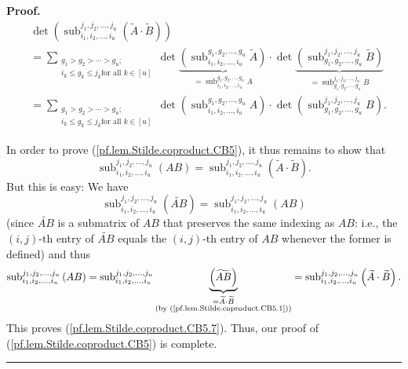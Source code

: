 \documentclass[numbers=enddot,12pt,final,onecolumn,notitlepage]{scrartcl}%
\numberwithin{exer}{section}
\theoremstyle{definition}
\newenvironment{proof}[1][Proof]{\noindent\textbf{#1.} }{\ \rule{0.5em}{0.5em}}
\let\sumnonlimits\sum
\renewcommand{\sum}{\sumnonlimits\limits}
\theoremstyle{plainsl}
\begin{document}
\begin{proof}
\begin{align*}
&  \det\left(  \operatorname*{sub}\nolimits_{i_{1},i_{2},\ldots,i_{u}}%
^{j_{1},j_{2},\ldots,j_{u}}\left(  \widetilde{A}\cdot\widetilde{B}\right)
\right) \\
&  =\sum_{\substack{g_{1}>g_{2}>\cdots>g_{u};\\i_{k}\leq g_{k}\leq j_{k}\text{
for all }k\in\left[  u\right]  }}\det\underbrace{\left(  \operatorname*{sub}%
\nolimits_{i_{1},i_{2},\ldots,i_{u}}^{g_{1},g_{2},\ldots,g_{u}}\widetilde{A}%
\right)  }_{=\operatorname*{sub}\nolimits_{i_{1},i_{2},\ldots,i_{u}}%
^{g_{1},g_{2},\ldots,g_{u}}A}\cdot\det\underbrace{\left(  \operatorname*{sub}%
\nolimits_{g_{1},g_{2},\ldots,g_{u}}^{j_{1},j_{2},\ldots,j_{u}}\widetilde{B}%
\right)  }_{=\operatorname*{sub}\nolimits_{g_{1},g_{2},\ldots,g_{u}}%
^{j_{1},j_{2},\ldots,j_{u}}B}\\
&  =\sum_{\substack{g_{1}>g_{2}>\cdots>g_{u};\\i_{k}\leq g_{k}\leq j_{k}\text{
for all }k\in\left[  u\right]  }}\det\left(  \operatorname*{sub}%
\nolimits_{i_{1},i_{2},\ldots,i_{u}}^{g_{1},g_{2},\ldots,g_{u}}A\right)
\cdot\det\left(  \operatorname*{sub}\nolimits_{g_{1},g_{2},\ldots,g_{u}%
}^{j_{1},j_{2},\ldots,j_{u}}B\right)  .
\end{align*}


In order to prove (\ref{pf.lem.Stilde.coproduct.CB5}), it thus remains to show
that%
\begin{equation}
\operatorname*{sub}\nolimits_{i_{1},i_{2},\ldots,i_{u}}^{j_{1},j_{2}%
,\ldots,j_{u}}\left(  AB\right)  =\operatorname*{sub}\nolimits_{i_{1}%
,i_{2},\ldots,i_{u}}^{j_{1},j_{2},\ldots,j_{u}}\left(  \widetilde{A}%
\cdot\widetilde{B}\right)  . \label{pf.lem.Stilde.coproduct.CB5.7}%
\end{equation}
But this is easy: We have%
\[
\operatorname*{sub}\nolimits_{i_{1},i_{2},\ldots,i_{u}}^{j_{1},j_{2}%
,\ldots,j_{u}}\left(  \widetilde{AB}\right)  =\operatorname*{sub}%
\nolimits_{i_{1},i_{2},\ldots,i_{u}}^{j_{1},j_{2},\ldots,j_{u}}\left(
AB\right)
\]
(since $\widetilde{AB}$ is a submatrix of $AB$ that preserves the same
indexing as $AB$: i.e., the $\left(  i,j\right)  $-th entry of $\widetilde{AB}%
$ equals the $\left(  i,j\right)  $-th entry of $AB$ whenever the former is
defined) and thus%
\[
\operatorname*{sub}\nolimits_{i_{1},i_{2},\ldots,i_{u}}^{j_{1},j_{2}%
,\ldots,j_{u}}\left(  AB\right)  =\operatorname*{sub}\nolimits_{i_{1}%
,i_{2},\ldots,i_{u}}^{j_{1},j_{2},\ldots,j_{u}}\underbrace{\left(
\widetilde{AB}\right)  }_{\substack{=\widetilde{A}\cdot\widetilde{B}%
\\\text{(by (\ref{pf.lem.Stilde.coproduct.CB5.1}))}}}=\operatorname*{sub}%
\nolimits_{i_{1},i_{2},\ldots,i_{u}}^{j_{1},j_{2},\ldots,j_{u}}\left(
\widetilde{A}\cdot\widetilde{B}\right)  .
\]
This proves (\ref{pf.lem.Stilde.coproduct.CB5.7}). Thus, our proof of
(\ref{pf.lem.Stilde.coproduct.CB5}) is complete.
\end{proof}
\end{document}
